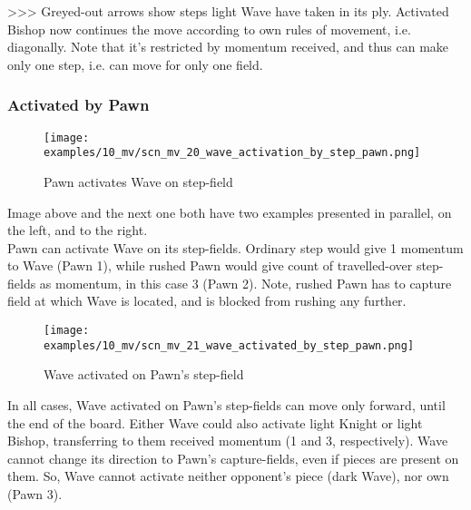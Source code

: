 \textgreater \textgreater \textgreater
Greyed-out arrows show steps light Wave have taken in its ply. Activated Bishop
now continues the move according to own rules of movement, i.e. diagonally. Note
that it's restricted by momentum received, and thus can make only one step, i.e.
can move for only one field.

\clearpage %

\subsubsection*{Activated by Pawn}

\vspace*{-1.5\baselineskip}
\noindent
\begin{figure}[!h]
\texttt{[image: examples/10\_mv/scn\_mv\_20\_wave\_activation\_by\_step\_pawn.png]}
\vspace*{-1.3\baselineskip}
\caption{Pawn activates Wave on step-field}
\label{fig:scn_mv_20_wave_activation_by_step_pawn}
\end{figure}

\vspace*{-0.5\baselineskip}
Image above and the next one both have two examples presented in parallel, on the
left, and to the right. \\
Pawn can activate Wave on its step-fields. Ordinary step would give 1 momentum to
Wave (Pawn 1), while rushed Pawn would give count of travelled-over step-fields as
momentum, in this case 3 (Pawn 2). Note, rushed Pawn has to capture field at which
Wave is located, and is blocked from rushing any further.

\clearpage %

\vspace*{-2.1\baselineskip}
\noindent
\begin{figure}[!h]
\texttt{[image: examples/10\_mv/scn\_mv\_21\_wave\_activated\_by\_step\_pawn.png]}
\caption{Wave activated on Pawn's step-field}
\label{fig:scn_mv_21_wave_activated_by_step_pawn}
\end{figure}

In all cases, Wave activated on Pawn's step-fields can move only forward, until the end
of the board. Either Wave could also activate light Knight or light Bishop, transferring
to them received momentum (1 and 3, respectively). Wave cannot change its direction to
Pawn's capture-fields, even if pieces are present on them. So, Wave cannot activate neither
opponent's piece (dark Wave), nor own (Pawn 3).

